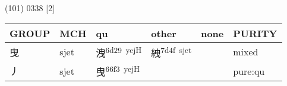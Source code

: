 \documentclass[14pt,a4paper]{scrartcl}
\begin{document}
(101) 0338 {[}2{]}

\begin{longtable}[c]{@{}llllll@{}}
\toprule
\begin{minipage}[b]{0.14\columnwidth}\raggedright\strut
GROUP
\strut\end{minipage} &
\begin{minipage}[b]{0.14\columnwidth}\raggedright\strut
MCH
\strut\end{minipage} &
\begin{minipage}[b]{0.14\columnwidth}\raggedright\strut
qu
\strut\end{minipage} &
\begin{minipage}[b]{0.14\columnwidth}\raggedright\strut
other
\strut\end{minipage} &
\begin{minipage}[b]{0.14\columnwidth}\raggedright\strut
none
\strut\end{minipage} &
\begin{minipage}[b]{0.14\columnwidth}\raggedright\strut
PURITY
\strut\end{minipage}\tabularnewline
\midrule
\endhead
\begin{minipage}[t]{0.14\columnwidth}\raggedright\strut
曳
\strut\end{minipage} &
\begin{minipage}[t]{0.14\columnwidth}\raggedright\strut
sjet
\strut\end{minipage} &
\begin{minipage}[t]{0.14\columnwidth}\raggedright\strut
洩\textsuperscript{6d29~yejH}
\strut\end{minipage} &
\begin{minipage}[t]{0.14\columnwidth}\raggedright\strut
絏\textsuperscript{7d4f~sjet}
\strut\end{minipage} &
\begin{minipage}[t]{0.14\columnwidth}\raggedright\strut
\strut\end{minipage} &
\begin{minipage}[t]{0.14\columnwidth}\raggedright\strut
mixed
\strut\end{minipage}\tabularnewline
\begin{minipage}[t]{0.14\columnwidth}\raggedright\strut
丿
\strut\end{minipage} &
\begin{minipage}[t]{0.14\columnwidth}\raggedright\strut
sjet
\strut\end{minipage} &
\begin{minipage}[t]{0.14\columnwidth}\raggedright\strut
曳\textsuperscript{66f3~yejH}
\strut\end{minipage} &
\begin{minipage}[t]{0.14\columnwidth}\raggedright\strut
\strut\end{minipage} &
\begin{minipage}[t]{0.14\columnwidth}\raggedright\strut
\strut\end{minipage} &
\begin{minipage}[t]{0.14\columnwidth}\raggedright\strut
pure:qu
\strut\end{minipage}\tabularnewline
\bottomrule
\end{longtable}
\end{document}
